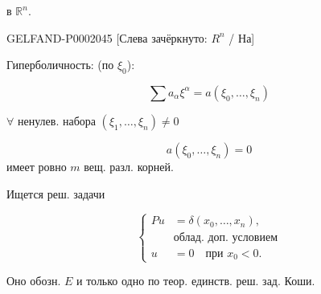 в $\mathbb R^n$.






\begin{GelfandAdjacentEvidence}{GELFAND-P000204}{5}
[Слева зачёркнуто: $R^n$ / На]
\end{GelfandAdjacentEvidence}

Гиперболичность: (по $\xi_0$):



\begin{equation*}\sum a_\alpha\xi^\alpha=a(\xi_0,\ldots,\xi_n)\end{equation*}



$\forall$ ненулев. набора $(\xi_1,\ldots,\xi_n)\ne0$



\begin{equation*}a(\xi_0,\ldots,\xi_n)=0\end{equation*}
имеет ровно $m$ вещ. разл. корней.



Ищется реш. задачи



\begin{equation*}\left\{\begin{aligned}
Pu&=\delta(x_0,\ldots,x_n),\\
&\text{облад. доп. условием}\\
u&=0\quad\text{при }x_0<0.
\end{aligned}\right.\end{equation*}



Оно обозн. $E$ и только одно по теор. единств. реш. зад. Коши.



